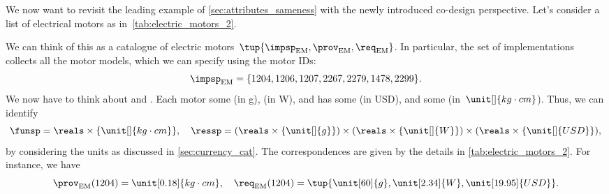 \begin{example}
    \label{exa:dpi_elmotor}
    We now want to revisit the leading example of \cref{sec:attributes_sameness} with the newly introduced co-design perspective. Let's consider a list of electrical motors as in~\cref{tab:electric_motors_2}.
    \begin{table*}[h]
        \centering
        \caption{A simplified catalogue of motors.}
        \label{tab:electric_motors_2}
    \end{table*}

    We can think of this as a catalogue of electric motors~$\tup{\impsp_\mathrm{EM},\prov_\mathrm{EM},\req_\mathrm{EM}}$.
    In particular, the set of implementations collects all the motor models, which we can specify using the motor IDs:
    \begin{equation}
        \impsp_\mathrm{EM}=\{1204,1206,1207,2267,2279,1478,2299 \}.
    \end{equation}
    We now have to think about  and .
    Each motor  some  (in \unit[]{g}),  (in \unit[]{W}), and has some  (in USD), and  some  (in~$\unit[]{kg\cdot cm}$).
    Thus, we can identify
    \begin{equation*}
        \funsp =\reals\times \{\unit[]{kg\cdot cm}\},\quad \ressp=(\reals\times \{\unit[]{g}\})\times (\reals\times \{\unit[]{W}\})\times (\reals\times \{\unit[]{USD}\}),
    \end{equation*}
    by considering the units as discussed in \cref{sec:currency_cat}.
    The correspondences are given by the details in \cref{tab:electric_motors_2}.
    For instance, we have
    \begin{equation}
        \prov_\mathrm{EM}(1204)=\unit[0.18]{kg\cdot cm}, \quad \req_\mathrm{EM}(1204)=\tup{\unit[60]{g},\unit[2.34]{W},\unit[19.95]{USD}}.
    \end{equation}


\end{example}
